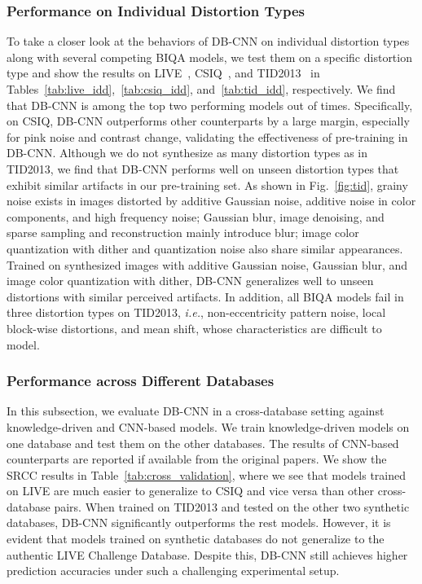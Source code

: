 \documentclass[journal]{IEEEtran}
\begin{document}
\subsubsection{Performance on Individual Distortion Types}\label{subsec:individual_distortions}
To take a closer look at the behaviors of DB-CNN on individual distortion types along with several competing BIQA models, we test them on a specific distortion type and show the results on LIVE~\cite{sheikh2006statistical}, CSIQ~\cite{larson2010most}, and TID2013~\cite{ponomarenko2013color} in Tables~\ref{tab:live_idd},~\ref{tab:csiq_idd}, and~\ref{tab:tid_idd}, respectively. We find that DB-CNN is among the top two performing models   out of  times. Specifically, on CSIQ, DB-CNN outperforms other counterparts by a large margin, especially for pink noise and contrast change, validating the effectiveness of pre-training in DB-CNN. Although we do not synthesize as many distortion types as in TID2013, we find that DB-CNN performs well on unseen distortion types that exhibit similar artifacts in our pre-training set. As shown in Fig.~\ref{fig:tid}, grainy noise exists in images distorted by additive Gaussian noise, additive noise in color components, and high frequency noise; Gaussian blur, image denoising, and sparse sampling and reconstruction mainly introduce blur; image color quantization with dither and quantization noise also share similar appearances. Trained on synthesized images with additive Gaussian noise, Gaussian blur, and image color quantization with dither, DB-CNN  generalizes well to unseen distortions with similar perceived artifacts. In addition, all BIQA models fail in three distortion types on TID2013, \textit{i.e.}, non-eccentricity pattern noise, local block-wise distortions, and mean shift, whose characteristics are difficult to model.




\subsubsection{Performance across Different Databases}\label{subsec:cross_database}
In this subsection, we evaluate DB-CNN in a cross-database setting against knowledge-driven and CNN-based models. We train knowledge-driven models on one database and test them on the other databases. The results of CNN-based counterparts are reported if available from the original papers.
We show the SRCC results in Table~\ref{tab:cross_validation}, where we see that models trained on LIVE are much easier to generalize to CSIQ and vice versa than other cross-database pairs. When trained on TID2013 and tested on the other two synthetic databases, DB-CNN significantly outperforms the rest  models. However, it is evident that models trained on synthetic databases do not generalize to the authentic LIVE Challenge Database. Despite this, DB-CNN still achieves higher prediction accuracies under such a challenging experimental setup.
\end{document}
